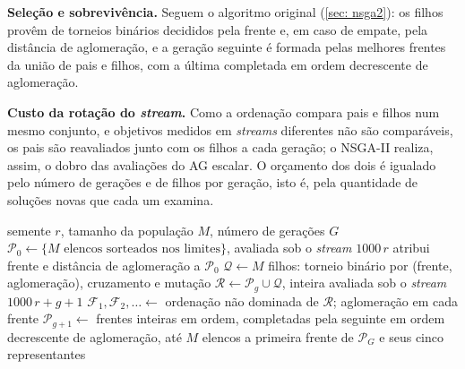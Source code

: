 \textbf{Seleção e sobrevivência.} Seguem o algoritmo original (\autoref{sec: nsga2}): os filhos provêm de torneios binários decididos pela frente e, em caso de empate, pela distância de aglomeração, e a geração seguinte é formada pelas melhores frentes da união de pais e filhos, com a última completada em ordem decrescente de aglomeração.

\textbf{Custo da rotação do \textit{stream}.} Como a ordenação compara pais e filhos num mesmo conjunto, e objetivos medidos em \textit{streams} diferentes não são comparáveis, os pais são reavaliados junto com os filhos a cada geração; o NSGA-II realiza, assim, o dobro das avaliações do AG escalar. O orçamento dos dois é igualado pelo número de gerações e de filhos por geração, isto é, pela quantidade de soluções novas que cada um examina.

\begin{algoritmo}[htb]
    \caption{NSGA-II com rotação do \textit{stream} de avaliação.}
    \label{alg: nsga2}
    \begin{algorithmic}[1]
        \Require semente $r$, tamanho da população $M$, número de gerações $G$
        \State $\mathcal{P}_0 \gets \{M \text{ elencos sorteados nos limites}\}$, avaliada sob o \textit{stream} $1000\,r$
        \State atribui frente e distância de aglomeração a $\mathcal{P}_0$
            \State $\mathcal{Q} \gets M$ filhos: torneio binário por (frente, aglomeração), cruzamento e mutação
            \State $\mathcal{R} \gets \mathcal{P}_g \cup \mathcal{Q}$, inteira avaliada sob o \textit{stream} $1000\,r + g + 1$
            \State $\mathcal{F}_1, \mathcal{F}_2, \ldots \gets$ ordenação não dominada de $\mathcal{R}$; aglomeração em cada frente
            \State $\mathcal{P}_{g+1} \gets$ frentes inteiras em ordem, completadas pela seguinte em ordem decrescente de aglomeração, até $M$ elencos
        \EndFor
        \State \Return a primeira frente de $\mathcal{P}_G$ e seus cinco representantes
    \end{algorithmic}
    \source
\end{algoritmo}

